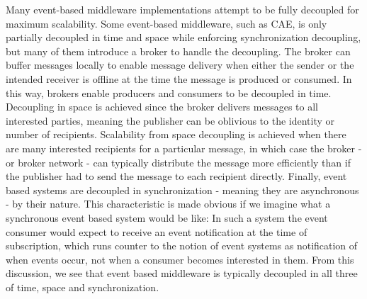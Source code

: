 \documentclass{acm_proc_article-sp}
\begin{document}
Many event-based middleware implementations attempt to be fully decoupled for maximum scalability. Some event-based middleware, such as CAE, is only partially decoupled in time and space while enforcing synchronization decoupling, but many of them introduce a broker to handle the decoupling. The broker can buffer messages locally to enable message delivery when either the sender or the intended receiver is offline at the time the message is produced or consumed. In this way, brokers enable producers and consumers to be decoupled in time. Decoupling in space is achieved since the broker delivers messages to all interested parties, meaning the publisher can be oblivious to the identity or number of recipients. Scalability from space decoupling is achieved when there are many interested recipients for a particular message, in which case the broker - or broker network - can typically distribute the message more efficiently than if the publisher had to send the message to each recipient directly. Finally, event based systems are decoupled in synchronization - meaning they are asynchronous - by their nature. This characteristic is made obvious if we imagine what a synchronous event based system would be like: In such a system the event consumer would expect to receive an event notification at the time of subscription, which runs counter to the notion of event systems as notification of when events occur, not when a consumer becomes interested in them. From this discussion, we see that event based middleware is typically decoupled in all three of time, space and synchronization. 


\end{document}
